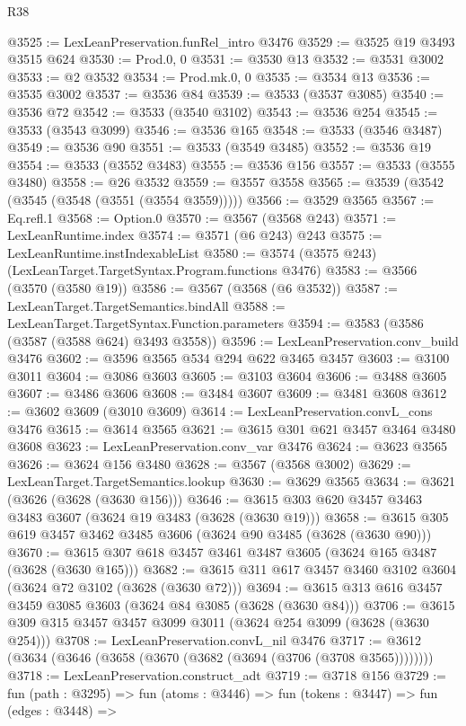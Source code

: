 \begin{lexlean}{R38}
\begin{coremodule}
@3525 := LexLeanPreservation.funRel_intro @3476
@3529 := @3525 @19 @3493 @3515 @624
@3530 := Prod.{0, 0}
@3531 := @3530 @13
@3532 := @3531 @3002
@3533 := @2 @3532
@3534 := Prod.mk.{0, 0}
@3535 := @3534 @13
@3536 := @3535 @3002
@3537 := @3536 @84
@3539 := @3533 (@3537 @3085)
@3540 := @3536 @72
@3542 := @3533 (@3540 @3102)
@3543 := @3536 @254
@3545 := @3533 (@3543 @3099)
@3546 := @3536 @165
@3548 := @3533 (@3546 @3487)
@3549 := @3536 @90
@3551 := @3533 (@3549 @3485)
@3552 := @3536 @19
@3554 := @3533 (@3552 @3483)
@3555 := @3536 @156
@3557 := @3533 (@3555 @3480)
@3558 := @26 @3532
@3559 := @3557 @3558
@3565 := @3539 (@3542 (@3545 (@3548 (@3551 (@3554 @3559)))))
@3566 := @3529 @3565
@3567 := Eq.refl.{1}
@3568 := Option.{0}
@3570 := @3567 (@3568 @243)
@3571 := LexLeanRuntime.index
@3574 := @3571 (@6 @243) @243
@3575 := LexLeanRuntime.instIndexableList
@3580 := @3574 (@3575 @243) (LexLeanTarget.TargetSyntax.Program.functions @3476)
@3583 := @3566 (@3570 (@3580 @19))
@3586 := @3567 (@3568 (@6 @3532))
@3587 := LexLeanTarget.TargetSemantics.bindAll
@3588 := LexLeanTarget.TargetSyntax.Function.parameters
@3594 := @3583 (@3586 (@3587 (@3588 @624) @3493 @3558))
@3596 := LexLeanPreservation.conv_build @3476
@3602 := @3596 @3565 @534 @294 @622 @3465 @3457
@3603 := @3100 @3011
@3604 := @3086 @3603
@3605 := @3103 @3604
@3606 := @3488 @3605
@3607 := @3486 @3606
@3608 := @3484 @3607
@3609 := @3481 @3608
@3612 := @3602 @3609 (@3010 @3609)
@3614 := LexLeanPreservation.convL_cons @3476
@3615 := @3614 @3565
@3621 := @3615 @301 @621 @3457 @3464 @3480 @3608
@3623 := LexLeanPreservation.conv_var @3476
@3624 := @3623 @3565
@3626 := @3624 @156 @3480
@3628 := @3567 (@3568 @3002)
@3629 := LexLeanTarget.TargetSemantics.lookup
@3630 := @3629 @3565
@3634 := @3621 (@3626 (@3628 (@3630 @156)))
@3646 := @3615 @303 @620 @3457 @3463 @3483 @3607 (@3624 @19 @3483 (@3628 (@3630 @19)))
@3658 := @3615 @305 @619 @3457 @3462 @3485 @3606 (@3624 @90 @3485 (@3628 (@3630 @90)))
@3670 := @3615 @307 @618 @3457 @3461 @3487 @3605 (@3624 @165 @3487 (@3628 (@3630 @165)))
@3682 := @3615 @311 @617 @3457 @3460 @3102 @3604 (@3624 @72 @3102 (@3628 (@3630 @72)))
@3694 := @3615 @313 @616 @3457 @3459 @3085 @3603 (@3624 @84 @3085 (@3628 (@3630 @84)))
@3706 := @3615 @309 @315 @3457 @3457 @3099 @3011 (@3624 @254 @3099 (@3628 (@3630 @254)))
@3708 := LexLeanPreservation.convL_nil @3476
@3717 := @3612 (@3634 (@3646 (@3658 (@3670 (@3682 (@3694 (@3706 (@3708 @3565))))))))
@3718 := LexLeanPreservation.construct_adt
@3719 := @3718 @156
@3729 := fun (path : @3295) =>
  fun (atoms : @3446) =>
  fun (tokens : @3447) =>
  fun (edges : @3448) =>

\end{coremodule}
\end{lexlean}
